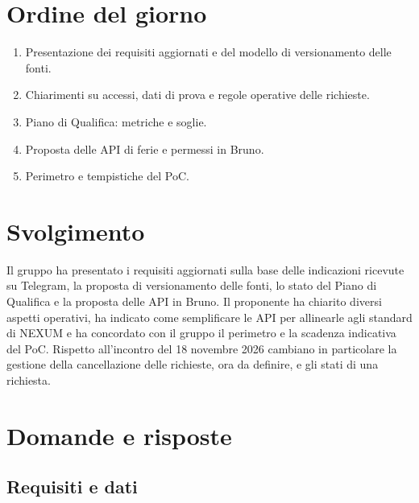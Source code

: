 \documentclass[verbale=esterno]{gpt}
\begin{document}
\section{Ordine del giorno}
\begin{enumerate}
  \item Presentazione dei requisiti aggiornati e del modello di versionamento delle fonti.
  \item Chiarimenti su accessi, dati di prova e regole operative delle richieste.
  \item Piano di Qualifica: metriche e soglie.
  \item Proposta delle API di ferie e permessi in Bruno.
  \item Perimetro e tempistiche del PoC.
\end{enumerate}

\section{Svolgimento}
Il gruppo ha presentato i requisiti aggiornati sulla base delle indicazioni ricevute su Telegram, la proposta di versionamento delle fonti, lo stato del Piano di Qualifica e la proposta delle API in Bruno. Il proponente ha chiarito diversi aspetti operativi, ha indicato come semplificare le API per allinearle agli standard di NEXUM e ha concordato con il gruppo il perimetro e la scadenza indicativa del PoC. Rispetto all'incontro del 18 novembre 2026 cambiano in particolare la gestione della cancellazione delle richieste, ora da definire, e gli stati di una richiesta.

\section{Domande e risposte}

\subsection{Requisiti e dati}


\end{document}
